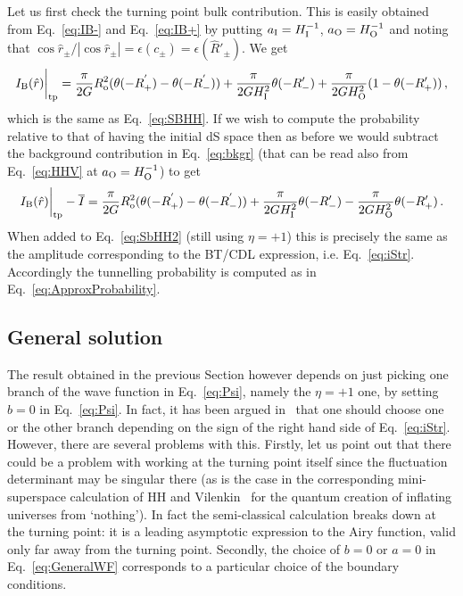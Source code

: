 \documentclass[11pt,a4paper]{article}
\begin{document}
Let us first check the turning point bulk contribution.
This is easily obtained from Eq.~\eqref{eq:IB-} and Eq.~\eqref{eq:IB+} by putting $a_{\rm I} = H_{\rm I}^{-1}$, $a_{\rm O} = H_{\rm O}^{-1}$ and noting that $\cos\hat{r}_{\pm}/|\cos\hat{r}_{\pm}|=\epsilon(c_{\pm})=\epsilon(\hat{R}'_{\pm})$. We get
\begin{equation}
I_{\rm B}(\hat{r})\bigg|_{{\rm tp}} = \frac{\pi}{2G}R_{\rm o}^{2}(\theta(-R_{+}^{'}) - \theta(-R_{-}^{'})) + \frac{\pi}{2 G H_{\rm I}^{2}} \theta(-R'_{-}) + \frac{\pi}{2 G H_{\rm O}^{2}}(1 - \theta(-R'_{+})) \,,
\end{equation}
which is the same as Eq.~\eqref{eq:SBHH}. If we wish to compute the probability relative to that of having the initial dS space then as before we would subtract the background contribution in Eq.~\eqref{eq:bkgr} (that can be read also from Eq.~\eqref{eq:HHV} at $a_{\rm O} = H^{-1}_{\rm O}$) to get 
\begin{equation}
I_{\rm B}(\hat{r})\bigg|_{{\rm tp}} - \overline{I} = \frac{\pi}{2 G}R_{\rm o}^{2}(\theta(-R_{+}^{'}) - \theta(-R_{-}^{'})) + \frac{\pi}{2 G H_{\rm I}^{2}} \theta(-R'_{-}) - \frac{\pi}{2 G H_{\rm O}^{2}} \theta(-R'_{+}) \,.
\end{equation}
When added to Eq.~\eqref{eq:SbHH2} (still using $\eta = +1$) this is precisely the same as the amplitude corresponding to the BT/CDL expression, i.e. Eq.~\eqref{eq:iStr}. Accordingly the tunnelling probability is computed as in Eq.~\eqref{eq:ApproxProbability}.

\subsection{General solution}
\label{sec:SuperpositionWF}

The result obtained in the previous Section however depends on just picking one branch of the wave function in Eq.~\eqref{eq:Psi}, namely the $\eta = +1$ one, by setting $b = 0$ in Eq.~\eqref{eq:Psi}. In fact, it has been argued in~\cite{Bachlechner:2016mtp} that one should choose one or the other branch depending on the sign of the right hand side of Eq.~\eqref{eq:iStr}. However, there are several problems with this. Firstly, let us point out that there could be a problem with working at the turning point itself since the fluctuation determinant may be singular there (as is the case in the corresponding mini-superspace calculation of HH and Vilenkin~\cite{Hartle:1983ai, Vilenkin:1984wp} for the quantum creation of inflating universes from `nothing'). In fact the semi-classical calculation breaks down at the turning point: it is a leading asymptotic expression to the Airy function, valid only far away from the turning point. Secondly, the choice of $b = 0$ or $a = 0$ in Eq.~\eqref{eq:GeneralWF} corresponds to a particular choice of the boundary conditions.  
\end{document}
